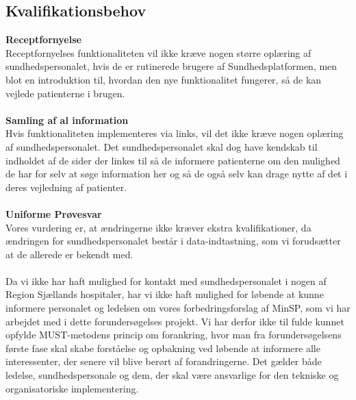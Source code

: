 \subsection{Kvalifikationsbehov}
\textbf{Receptfornyelse} \\
Receptfornyelses funktionaliteten vil ikke kræve nogen større oplæring af sundhedspersonalet, hvis de er rutinerede brugere af Sundhedsplatformen, men blot en introduktion til, hvordan den nye funktionalitet fungerer, så de kan vejlede patienterne i brugen.
\\\\
\textbf{Samling af al information} \\
Hvis funktionaliteten implementeres via links, vil det ikke kræve nogen oplæring af sundhedspersonalet. Det sundhedspersonalet skal dog have kendskab til indholdet af de sider der linkes til så de informere patienterne om den mulighed de har for selv at søge information her og så de også selv kan drage nytte af det i deres vejledning af patienter.
\\\\
\textbf{Uniforme Prøvesvar} \\
Vores vurdering er, at ændringerne ikke kræver ekstra kvalifikationer, da ændringen for sundhedspersonalet består i data-indtastning, som vi forudsætter at de allerede er bekendt med.\\\\
Da vi ikke har haft mulighed for kontakt med sundhedspersonalet i nogen af Region Sjællands hospitaler, har vi ikke haft mulighed for løbende at kunne informere personalet og ledelsen om vores forbedringsforslag af MinSP, som vi har arbejdet med i dette forundersøgelses projekt. Vi har derfor ikke til fulde kunnet opfylde MUST-metodens princip om forankring, hvor man fra forundersøgelsens første fase skal skabe forståelse og opbakning ved løbende at informere alle interessenter, der senere vil blive berørt af forandringerne. Det gælder både ledelse, sundhedspersonale og dem, der skal være ansvarlige for den tekniske og organisatoriske implementering.
